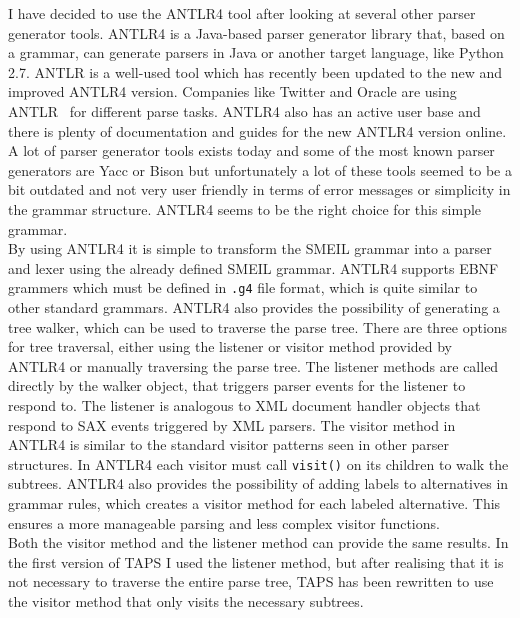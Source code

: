 I have decided to use the ANTLR4 tool after looking at several other parser generator tools. ANTLR4 is a Java-based parser generator library that, based on a grammar, can generate parsers in Java or another target language, like Python 2.7. ANTLR is a well-used tool which has recently been updated to the new and improved ANTLR4 version. Companies like Twitter and Oracle are using ANTLR~\cite{Parr2012} for different parse tasks. ANTLR4 also has an active user base and there is plenty of documentation and guides for the new ANTLR4 version online. A lot of parser generator tools exists today and some of the most known parser generators are Yacc or Bison but unfortunately a lot of these tools seemed to be a bit outdated and not very user friendly in terms of error messages or simplicity in the grammar structure. ANTLR4 seems to be the right choice for this simple grammar.\\

By using ANTLR4 it is simple to transform the SMEIL grammar into a parser and lexer using the already defined SMEIL grammar. ANTLR4 supports EBNF grammers which must be defined in \texttt{.g4} file format, which is quite similar to other standard grammars. ANTLR4 also provides the possibility of generating a tree walker, which can be used to traverse the parse tree. There are three options for tree traversal, either using the listener or visitor method provided by ANTLR4 or manually traversing the parse tree.
The listener methods are called directly by the walker object, that triggers parser events for the listener to respond to. The listener is analogous to XML document handler objects that respond to SAX events triggered by XML parsers. The visitor method in ANTLR4 is similar to the standard visitor patterns seen in other parser structures. In ANTLR4 each visitor must call \texttt{visit()} on its children to walk the subtrees. ANTLR4 also provides the possibility of adding labels to alternatives in grammar rules, which creates a visitor method for each labeled alternative. This ensures a more manageable parsing and less complex visitor functions. \\

Both the visitor method and the listener method can provide the same results. In the first version of TAPS I used the listener method, but after realising that it is not necessary to traverse the entire parse tree, TAPS has been rewritten to use the visitor method that only visits the necessary subtrees.\\

